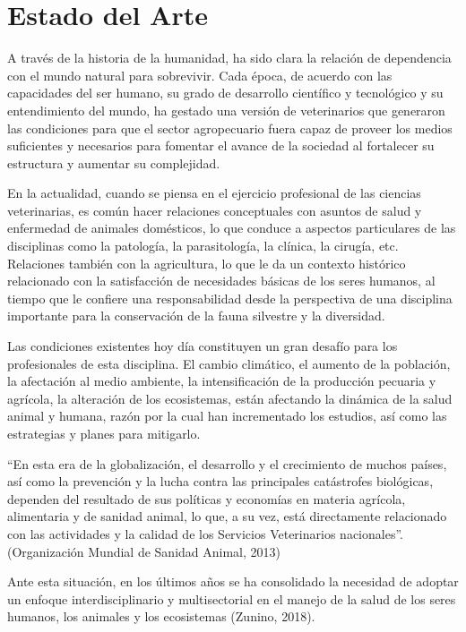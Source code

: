 
\chapter{Estado del Arte}\label{chapter:state-of-the-art}
A través de la historia de la humanidad, ha sido clara la relación de dependencia con el mundo natural para sobrevivir. Cada época, de acuerdo con las capacidades del ser humano, su grado de desarrollo científico y tecnológico y su entendimiento del mundo, ha gestado una versión de veterinarios que generaron las condiciones para que el sector agropecuario fuera capaz de proveer los medios suficientes y necesarios para fomentar el avance de la sociedad al fortalecer su estructura y aumentar su complejidad. 

En la actualidad, cuando se piensa en el ejercicio profesional de las ciencias veterinarias, es común hacer relaciones conceptuales con asuntos de salud y enfermedad de animales domésticos, lo que conduce a aspectos particulares de las disciplinas como la patología, la parasitología, la clínica, la cirugía, etc. Relaciones también con la agricultura, lo que le da un contexto histórico relacionado con la satisfacción de necesidades básicas de los seres humanos, al tiempo que le confiere una responsabilidad desde la perspectiva de una disciplina importante para la conservación de la fauna silvestre y la diversidad. 

Las condiciones existentes hoy día constituyen un gran desafío para los profesionales de esta disciplina.  El cambio climático, el aumento de la población, la afectación al medio ambiente, la intensificación de la producción pecuaria y agrícola, la alteración de los ecosistemas, están afectando la dinámica de la salud animal y humana, razón por la cual han incrementado los estudios, así como las estrategias y planes para mitigarlo. 

“En esta era de la globalización, el desarrollo y el crecimiento de muchos países, así como la prevención y la lucha contra las principales catástrofes biológicas, dependen del resultado de sus políticas y economías en materia agrícola, alimentaria y de sanidad animal, lo que, a su vez, está directamente relacionado con las actividades y la calidad de los Servicios Veterinarios nacionales”. (Organización Mundial de Sanidad Animal, 2013) 

Ante esta situación, en los últimos años se ha consolidado la necesidad de adoptar un enfoque interdisciplinario y multisectorial en el manejo de la salud de los seres humanos, los animales y los ecosistemas (Zunino, 2018). 

